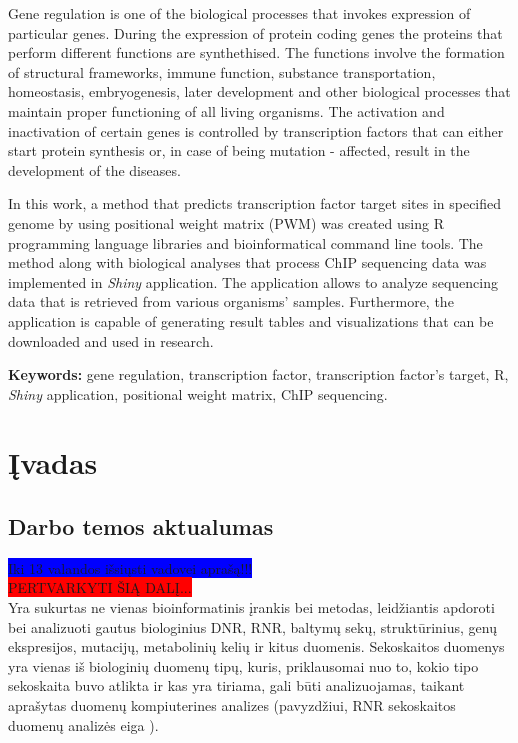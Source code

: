 \documentclass[12pt]{article}
\begin{document}
Gene regulation is one of the biological processes that invokes expression of
particular genes. During the expression of protein coding genes the proteins
that perform different functions are synthethised. The functions involve the
formation of structural frameworks, immune function, substance transportation,
homeostasis, embryogenesis, later development and other biological processes
that maintain proper functioning of all living organisms. The activation and
inactivation of certain genes is controlled by transcription factors that can
either start protein synthesis or, in case of being mutation - affected,
result in the development of the diseases.

In this work, a method that predicts transcription factor target sites in
specified genome by using positional weight matrix (PWM) was created using R
programming language libraries and bioinformatical command line tools. The
method along with biological analyses that process ChIP sequencing data was
implemented in \emph{Shiny} application. The application allows to analyze
sequencing data that is retrieved from various organisms' samples. Furthermore,
the application is capable of generating result tables and visualizations that
can be downloaded and used in research.

\hfill \break
\textbf{Keywords:} gene regulation, transcription factor, transcription factor's
target, R, \emph{Shiny} application, positional weight matrix, ChIP
sequencing.

\newpage


\section{Įvadas}
\subsection*{Darbo temos aktualumas}

\colorbox{blue}{Iki 13 valandos išsiųsti vadovei aprašą!!!}\\

\colorbox{red}{PERTVARKYTI ŠIĄ DALĮ...}\\
Yra sukurtas ne vienas bioinformatinis įrankis \cite{BIOTOOLS} bei metodas,
leidžiantis apdoroti bei analizuoti gautus biologinius DNR, RNR, baltymų sekų,
struktūrinius, genų ekspresijos, mutacijų, metabolinių kelių ir kitus
duomenis. Sekoskaitos duomenys yra vienas iš biologinių duomenų tipų, kuris,
priklausomai nuo to, kokio tipo sekoskaita buvo atlikta ir kas yra tiriama, gali
būti analizuojamas, taikant aprašytas duomenų kompiuterines analizes
(pavyzdžiui, RNR sekoskaitos duomenų analizės eiga \cite{RNASEQ}).
\end{document}
